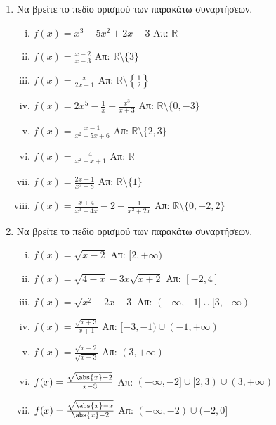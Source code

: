 \documentclass[a4paper,table]{report}
\begin{document}
\begin{center}
\end{center}

\vspace{\baselineskip}


\begin{enumerate}
    \item  Να βρείτε το πεδίο ορισμού των παρακάτω συναρτήσεων.
        \begin{enumerate}[i)]
            \item $ f(x) = x^{3} - 5x^{2} + 2x -3 $ \hfill Απ: $ \mathbb{R} $
            \item $ f(x) = \frac{x-2}{x-3} $ \hfill Απ: $ \mathbb{R} \setminus 
                \{ 3 \} $ 
            \item $ f(x) = \frac{x}{2x-1} $ \hfill Απ: 
                $ \mathbb{R} \setminus \left\{ \frac{1}{2} \right\} $ 
            \item $ f(x) = 2x^{5} - \frac{1}{x} + \frac{x^{3}}{x+3}  $ \hfill 
                Απ: $ \mathbb{R} \setminus \{ 0, -3 \} $
            \item $ f(x) = \frac{x-1}{x^{2} - 5x + 6} $ \hfill Απ: 
                $ \mathbb{R} \setminus \{ 2,3 \}  $ 
            \item $ f(x) = \frac{4}{x^{2}+x+1} $ \hfill Απ: $ \mathbb{R} $ 
            \item $ f(x) = \frac{2x-1}{x^{3}-8} $ \hfill Απ: 
                $ \mathbb{R} \setminus \{ 1 \}  $ 
            \item $ f(x) = \frac{x+4}{x^{3}-4x} -2 + \frac{1}{x^{2}+2x} $ 
                \hfill Απ: $ \mathbb{R} \setminus \{ 0,-2,2 \} $ 
        \end{enumerate}

    \item  Να βρείτε το πεδίο ορισμού των παρακάτω συναρτήσεων.
        \begin{enumerate}[i)]
            \item $ f(x) = \sqrt{x-2} $ \hfill Απ: $[2,+\infty)$
            \item $ f(x) = \sqrt{4-x} -3x \sqrt{x+2} $ \hfill Απ: $ [-2,4] $ 
            \item $ f(x) = \sqrt{x^{2}-2x-3} $ \hfill Απ: $ (-\infty,-1] 
                \cup [3,+\infty) $  
            \item $ f(x) = \frac{\sqrt{x+3}}{x+1} $ \hfill Απ: 
                $ [-3,-1) \cup (-1,+\infty)  $ 
            \item $ f(x) = \frac{\sqrt{x-2}}{\sqrt{x-3}} $ \hfill Απ:
                $ ( 3, +\infty ) $  
            \item $ f(x) = \frac{\sqrt{\abs{x}-2}}{x-3} $ \hfill 
                Απ: $ ( -\infty, -2 ] \cup [2,3) \cup (3,+\infty) $ 
            \item $ f(x) = \frac{\sqrt{\abs{x}-x}}{\abs{x}-2} $ \hfill Απ: 
                $ (-\infty,-2) \cup (-2,0] $
        \end{enumerate}


\end{enumerate}
\end{document}
